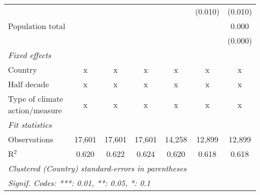 \begin{tabular}{lcccccc}
                                                                              &                &               &               &               & (0.010)       & (0.010)\\   
   Population total                                                           &                &               &               &               &               & 0.000\\   
                                                                              &                &               &               &               &               & (0.000)\\   
   \emph{Fixed effects}\\
   Country                                                                    & x              & x             & x             & x             & x             & x\\  
   Half decade                                                                & x              & x             & x             & x             & x             & x\\  
   Type of climate action/measure                                             & x              & x             & x             & x             & x             & x\\  
   \midrule \emph{Fit statistics}\\
   Observations                                                               & 17,601         & 17,601        & 17,601        & 14,258        & 12,899        & 12,899\\  
   R$^2$                                                                      & 0.620          & 0.622         & 0.624         & 0.620         & 0.618         & 0.618\\  
   \midrule
   \multicolumn{7}{l}{\emph{Clustered (Country) standard-errors in parentheses}}\\
   \multicolumn{7}{l}{\emph{Signif. Codes: ***: 0.01, **: 0.05, *: 0.1}}\\
\end{tabular}
\par\endgroup


